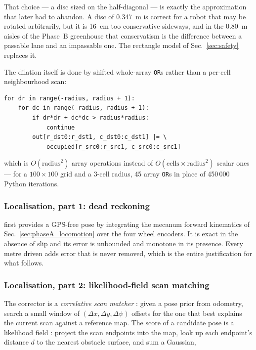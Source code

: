 That choice --- a disc sized on the half-diagonal --- is exactly the
approximation that \phaseB{} later had to abandon. A disc of
\SI{0.347}{m} is correct for a robot that may be rotated arbitrarily,
but it is \SI{16}{cm} too conservative sideways, and in the
\SI{0.80}{m} aisles of the Phase~B greenhouse that conservatism is the
difference between a passable lane and an impassable one. The rectangle
model of Sec.~\ref{sec:safety} replaces it.

The dilation itself is done by shifted whole-array \texttt{OR}s rather
than a per-cell neighbourhood scan:

\begin{lstlisting}[style=python]
for dr in range(-radius, radius + 1):
    for dc in range(-radius, radius + 1):
        if dr*dr + dc*dc > radius*radius:
            continue
        out[r_dst0:r_dst1, c_dst0:c_dst1] |= \
            occupied[r_src0:r_src1, c_src0:c_src1]
\end{lstlisting}

which is $O(\text{radius}^2)$ array operations instead of
$O(\text{cells} \times \text{radius}^2)$ scalar ones --- for a
$100\times100$ grid and a 3-cell radius, 45 array \texttt{OR}s in place
of 450\,000 Python iterations.



\subsubsection{Localisation, part 1: dead reckoning}

 first provides a GPS-free pose by integrating
the mecanum forward kinematics of Sec.~\ref{sec:phaseA_locomotion} over
the four wheel encoders. It is exact in the absence of slip and its
error is unbounded and monotone in its presence. Every metre driven adds
error that is never removed, which is the entire justification for what
follows.

\subsubsection{Localisation, part 2: likelihood-field scan matching}

The corrector is a \emph{correlative scan matcher}
\cite{olson2009correlative}: given a pose prior from odometry, search a
small window of $(\Delta x, \Delta y, \Delta\psi)$ offsets for the one
that best explains the current scan against a reference map. The score
of a candidate pose is a likelihood field \cite{thrun2005probabilistic}:
project the scan endpoints into the map, look up each endpoint's
distance $d$ to the nearest obstacle surface, and sum a Gaussian,

